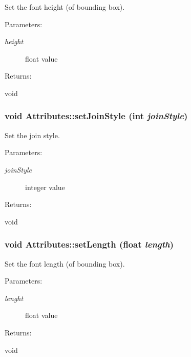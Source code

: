 Set the font height (of bounding box). \begin{Desc}
\item[Parameters: ]\par
\begin{description}
\item[{\em 
height}]float value \end{description}
\end{Desc}
\begin{Desc}
\item[Returns: ]\par
void \end{Desc}
\subsubsection{\setlength{\rightskip}{0pt plus 5cm}void Attributes::set\-Join\-Style (int {\em join\-Style})\hspace{0.3cm}{\tt  [inline]}}\label{classAttributes_a10}


Set the join style. \begin{Desc}
\item[Parameters: ]\par
\begin{description}
\item[{\em 
join\-Style}]integer value \end{description}
\end{Desc}
\begin{Desc}
\item[Returns: ]\par
void \end{Desc}
\subsubsection{\setlength{\rightskip}{0pt plus 5cm}void Attributes::set\-Length (float {\em length})\hspace{0.3cm}{\tt  [inline]}}\label{classAttributes_a22}


Set the font length (of bounding box). \begin{Desc}
\item[Parameters: ]\par
\begin{description}
\item[{\em 
lenght}]float value \end{description}
\end{Desc}
\begin{Desc}
\item[Returns: ]\par
void \end{Desc}
